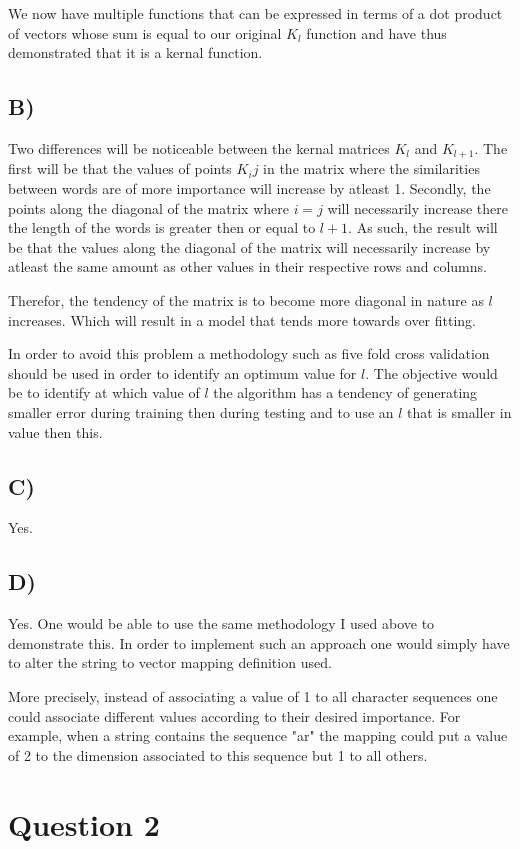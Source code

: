 \documentclass{report}
\begin{document}
We now have multiple functions that can
be expressed in terms of a dot product of vectors whose sum is equal to our original $K_l$
function and have thus demonstrated that it is a kernal function.

\subsection*{B)}
Two differences will be noticeable between the kernal matrices $K_l$ and $K_{l+1}$.
The first will be that the values of points $K_ij$ in the matrix where the similarities
between words are of more importance will increase by atleast 1. Secondly, the points
along the diagonal of the matrix where $i=j$ will necessarily increase there the
length of the words is greater then or equal to $l+1$. As such, the result will be that
the values along the diagonal of the matrix will necessarily increase by atleast
the same amount as other values in their respective rows and columns.

Therefor, the tendency of the matrix is to become more diagonal in nature as $l$
increases. Which will result in a model that tends more towards over fitting.

In order to avoid this problem a methodology such as five fold cross validation
should be used in order to identify an optimum value for $l$. The objective would be
to identify at which value of $l$ the algorithm has a tendency of generating smaller
error during training then during testing and to use an $l$ that is smaller in value
then this.
\subsection*{C)}
Yes.
\subsection*{D)}
Yes. One would be able to use the same methodology I used above to demonstrate this.
In order to implement such an approach one would simply have to alter the string to vector
mapping definition used. 

More precisely, instead of associating a value of 1 to all character
sequences one could associate different values according to their desired importance. For
example, when a string contains the sequence "ar" the mapping could put a value of 2
to the dimension associated to this sequence but 1 to all others.

\section*{Question 2}
\end{document}
